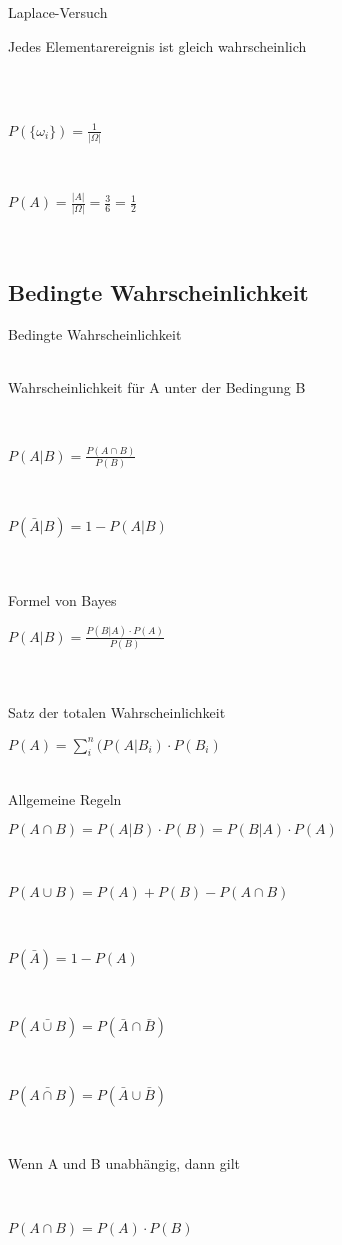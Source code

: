 \documentclass[10pt,a4paper,landscape]{article}
\begin{document}
\begin{multicols*}{4}
Laplace-Versuch\\
\parbox{\columnwidth}{\centering Jedes Elementarereignis ist gleich wahrscheinlich}\\\\
\parbox{\columnwidth}{\centering $P(\{\omega_i\}) = \frac{1}{\vert \Omega \vert}$}\\
\parbox{\columnwidth}{\centering $P(A) = \frac{\vert A \vert}{\vert \Omega \vert} = \frac{3}{6} = \frac{1}{2}$}\\

\subsection{Bedingte Wahrscheinlichkeit}
Bedingte Wahrscheinlichkeit\\\\
\parbox{\columnwidth}{\centering Wahrscheinlichkeit für A unter der Bedingung B}\\
\parbox{\columnwidth}{\centering $P(A \vert B) = \frac{P(A \cap B)}{P(B)}$}\\
\parbox{\columnwidth}{\centering $P(\bar{A} \vert B) = 1 - P(A \vert B)$}\\\\

Formel von Bayes\\
\parbox{\columnwidth}{\centering $P(A \vert B) = \frac{P(B \vert A) \cdot P(A)}{P(B)}$}\\\\

Satz der totalen Wahrscheinlichkeit\\
\parbox{\columnwidth}{\centering $P(A) = \sum \limits_{i}^n (P(A \vert B_i) \cdot P(B_i)$}\\

Allgemeine Regeln\\
\parbox{\columnwidth}{\centering $P(A \cap B) = P(A \vert B) \cdot P(B) = P(B \vert A) \cdot P(A)$}\\
\parbox{\columnwidth}{\centering $P(A \cup B) = P(A) + P(B) - P(A \cap B)$}\\ 
\parbox{\columnwidth}{\centering $P(\bar{A}) = 1 - P(A)$}\\ 
\parbox{\columnwidth}{\centering $P(\bar{A \cup B}) = P(\bar{A} \cap \bar{B})$}\\
\parbox{\columnwidth}{\centering $P(\bar{A \cap B}) = P(\bar{A} \cup \bar{B})$}\\
\parbox{\columnwidth}{\centering Wenn A und B unabhängig, dann gilt}\\
\parbox{\columnwidth}{\centering $P(A \cap B) = P(A) \cdot P(B)$}\\


\end{multicols*}
\end{document}
